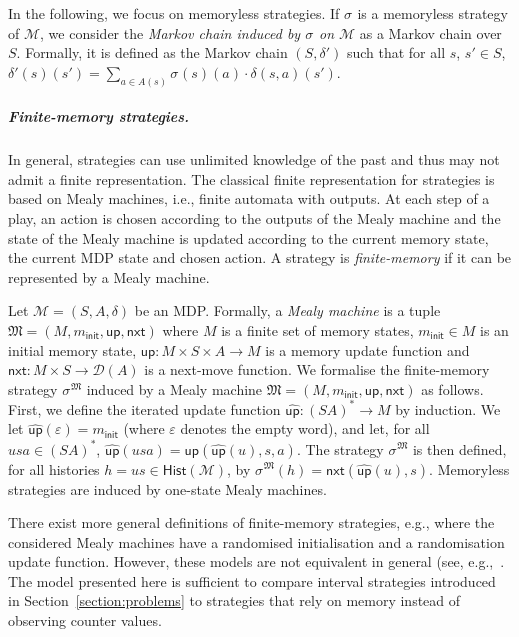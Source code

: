 \documentclass[a4paper,UKenglish,cleveref,autoref,thm-restate,colorlinks]{lipics-v2021}
\newcommand{\init}{\mathsf{init}}
\newcommand{\dist}[1]{\mathcal{D}(#1)}
\newcommand{\mdp}{\mathcal{M}}
\newcommand{\mdpStateSpace}{S}
\newcommand{\mdpState}{s}
\newcommand{\mdpActionSpace}{A}
\newcommand{\mdpAction}{a}
\newcommand{\mdpTrans}{\delta}
\newcommand{\mdpTuple}{(\mdpStateSpace, \mdpActionSpace, \mdpTrans)}
\newcommand{\histSet}[1]{\mathsf{Hist}(#1)}
\newcommand{\hist}{h}
\newcommand{\emptyword}{\varepsilon}
\newcommand{\mealy}{\mathfrak{M}}
\newcommand{\mealyStateSpace}{M}
\newcommand{\mealyState}{m}
\newcommand{\mealyStateInit}{\mealyState_\init}
\newcommand{\mealyUpdate}{\mathsf{up}}
\newcommand{\mealyNext}{\mathsf{nxt}}
\newcommand{\mealyUpdateHat}{\widehat{\mealyUpdate}}
\newcommand{\mealyTuple}{(\mealyStateSpace, \mealyStateInit, \mealyUpdate, \mealyNext)}
\newcommand{\stratGeneric}[1]{{\sigma_{#1}}}
\newcommand{\strat}{\stratGeneric{}}
\begin{document}
In the following, we focus on memoryless strategies.
If $\strat$ is a memoryless strategy of $\mdp$, we consider the \textit{Markov chain induced by $\strat$ on $\mdp$} as a Markov chain over $\mdpStateSpace$.
Formally, it is defined as the Markov chain $(\mdpStateSpace, \mdpTrans')$ such that for all $\mdpState$, $\mdpState'\in\mdpStateSpace$, $\mdpTrans'(\mdpState)(\mdpState') = \sum_{\mdpAction\in\mdpActionSpace(\mdpState)}\strat(\mdpState)(\mdpAction)\cdot \mdpTrans(\mdpState, \mdpAction)(\mdpState')$.

\subparagraph*{Finite-memory strategies.}
In general, strategies can use unlimited knowledge of the past and thus may not admit a finite representation.
The classical finite representation for strategies is based on Mealy machines, i.e., finite automata with outputs.
At each step of a play, an action is chosen according to the outputs of the Mealy machine and the state of the Mealy machine is updated according to the current memory state, the current MDP state and chosen action.
A strategy is \textit{finite-memory} if it can be represented by a Mealy machine.

Let $\mdp=\mdpTuple$ be an MDP.
Formally, a \textit{Mealy machine} is a tuple $\mealy = \mealyTuple$ where $\mealyStateSpace$ is a finite set of memory states, $\mealyStateInit\in\mealyStateSpace$ is an initial memory state, $\mealyUpdate\colon\mealyStateSpace\times\mdpStateSpace\times\mdpActionSpace\to\mealyStateSpace$ is a memory update function and $\mealyNext\colon\mealyStateSpace\times\mdpStateSpace\to\dist{\mdpActionSpace}$ is a next-move function.
We formalise the finite-memory strategy $\strat^\mealy$ induced by a Mealy machine $\mealy=\mealyTuple$ as follows.
First, we define the iterated update function $\mealyUpdateHat\colon(\mdpStateSpace\mdpActionSpace)^*\to\mealyStateSpace$ by induction.
We let $\mealyUpdateHat(\emptyword) = \mealyStateInit$ (where $\emptyword$ denotes the empty word), and let, for all $u\mdpState\mdpAction\in(\mdpStateSpace\mdpActionSpace)^*$, $\mealyUpdateHat(u\mdpState\mdpAction) = \mealyUpdate(\mealyUpdateHat(u), \mdpState, \mdpAction)$.
The strategy $\strat^\mealy$ is then defined, for all histories $\hist = u\mdpState\in\histSet{\mdp}$, by $\strat^\mealy(\hist) = \mealyNext(\mealyUpdateHat(u), \mdpState)$.
Memoryless strategies are induced by one-state Mealy machines.

\begin{remark}
  There exist more general definitions of finite-memory strategies, e.g., where the considered Mealy machines have a randomised initialisation and a randomisation update function.
  However, these models are not equivalent in general (see, e.g.,~\cite{DBLP:journals/iandc/MainR24}.
  The model presented here is sufficient to compare interval strategies introduced in Section~\ref{section:problems} to strategies that rely on memory instead of observing counter values.
\end{remark}
\end{document}
